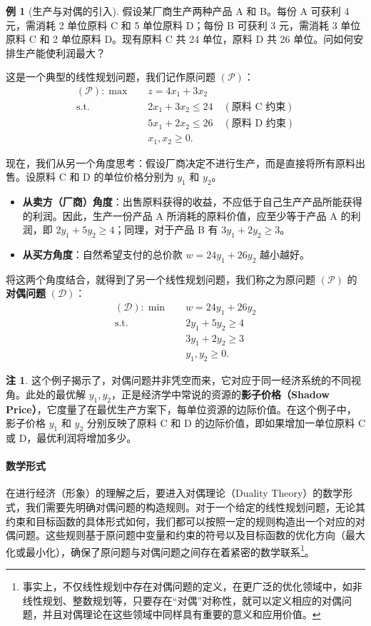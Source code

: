 \documentclass[12pt]{article}
\theoremstyle{plain}
\theoremstyle{definition}
\newtheorem{rmk}{注}[subsection]
\newtheorem{exm}{例}[subsection]
\newcommand{\st}{\mathrel{\text{s.t.}}}
\begin{document}
\begin{exm}[生产与对偶的引入]
    假设某厂商生产两种产品 A 和 B。每份 A 可获利 4 元，需消耗 2 单位原料 C 和 5 单位原料 D；每份 B 可获利 3 元，需消耗 3 单位原料 C 和 2 单位原料 D。现有原料 C 共 24 单位，原料 D 共 26 单位。问如何安排生产能使利润最大？
    
    这是一个典型的线性规划问题，我们记作原问题 $(\mathcal{P})$：
    \begin{align*}
        (\mathcal{P}): \max \quad & z = 4x_1 + 3x_2 \\
        \st \quad & 2x_1 + 3x_2 \leq 24 \quad (\text{原料 C 约束}) \\
        & 5x_1 + 2x_2 \leq 26 \quad (\text{原料 D 约束}) \\
        & x_1, x_2 \geq 0.
    \end{align*}

    现在，我们从另一个角度思考：假设厂商决定不进行生产，而是直接将所有原料出售。设原料 C 和 D 的单位价格分别为 $y_1$ 和 $y_2$。
    \begin{itemize}
        \item \textbf{从卖方（厂商）角度}：出售原料获得的收益，不应低于自己生产产品所能获得的利润。因此，生产一份产品 A 所消耗的原料价值，应至少等于产品 A 的利润，即 $2y_1 + 5y_2 \geq 4$；同理，对于产品 B 有 $3y_1 + 2y_2 \geq 3$。
        \item \textbf{从买方角度}：自然希望支付的总价款 $w = 24y_1 + 26y_2$ 越小越好。
    \end{itemize}
    将这两个角度结合，就得到了另一个线性规划问题，我们称之为原问题 $(\mathcal{P})$ 的\textbf{对偶问题} $(\mathcal{D})$：
    \begin{align*}
        (\mathcal{D}): \min \quad & w = 24y_1 + 26y_2 \\
        \st \quad & 2y_1 + 5y_2 \geq 4 \\
        & 3y_1 + 2y_2 \geq 3 \\
        & y_1, y_2 \geq 0.
    \end{align*}
\end{exm}
\begin{rmk}
    这个例子揭示了，对偶问题并非凭空而来，它对应于同一经济系统的不同视角。此处的最优解 $y_1, y_2$，正是经济学中常说的资源的\textbf{影子价格（Shadow Price）}，它度量了在最优生产方案下，每单位资源的边际价值。在这个例子中，影子价格 $y_1$ 和 $y_2$ 分别反映了原料 C 和 D 的边际价值，即如果增加一单位原料 C 或 D，最优利润将增加多少。
\end{rmk}

\paragraph{数学形式} 在进行经济（形象）的理解之后，要进入对偶理论（Duality Theory）的数学形式，我们需要先明确对偶问题的构造规则。对于一个给定的线性规划问题，无论其约束和目标函数的具体形式如何，我们都可以按照一定的规则构造出一个对应的对偶问题。这些规则基于原问题中变量和约束的符号以及目标函数的优化方向（最大化或最小化），确保了原问题与对偶问题之间存在着紧密的数学联系\footnote{事实上，不仅线性规划中存在对偶问题的定义，在更广泛的优化领域中，如非线性规划、整数规划等，只要存在“对偶”对称性，就可以定义相应的对偶问题，并且对偶理论在这些领域中同样具有重要的意义和应用价值。}。
\end{document}
